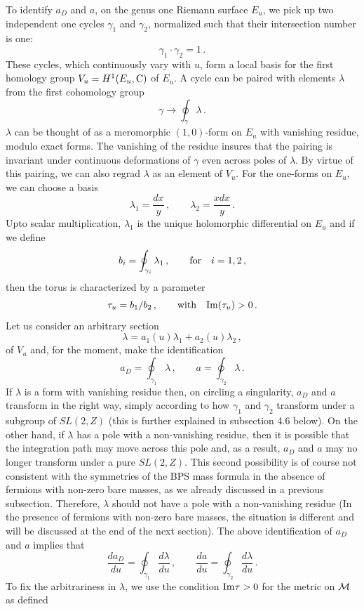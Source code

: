 To identify $a_D$ and $a$, on the genus one Riemann surface $E_u$, we
pick up two independent one cycles $\gamma_1$ and $\gamma_2$,
normalized such that their intersection number is one: 
$$
\gamma_1 \cdot \gamma_2 = 1\,.
$$
These cycles, which continuously vary with $u$, form a local basis for
the first homology group $V_u=H^1(E_u,{\rm C})$ of $E_u$. A cycle can
be paired with elements $\lambda$ from the first cohomology group 
$$
\gamma \rightarrow  \oint_{\gamma} \lambda\,.
$$
$\lambda$ can be thought of as a meromorphic $(1,0)$-form on $E_u$
with vanishing residue, modulo exact forms. The vanishing of the
residue insures that the pairing is invariant under continuous
deformations of $\gamma$ even across poles of $\lambda$. By virtue of
this pairing, we can also regrad $\lambda$ as an element of $V_u$. For
the one-forms on $E_u$, we can choose a basis   
$$
\lambda_{1} = \frac{dx}{y}\,, \qquad \lambda_{2} = \frac{xdx}{y}\,.
$$
Upto scalar multiplication, $\lambda_1$ is the unique holomorphic
differential on $E_u$ and if we define
$$
b_i=\oint_{\gamma_i}\lambda_1\,,\qquad{\rm for}\quad i = 1,2\,,
$$
then the torus is characterized by a parameter
$$
\tau_u = b_1/b_2\,,\qquad {\rm with} \quad {\rm Im}(\tau_u) > 0\,. 
$$
Let us consider an arbitrary section
$$
\lambda = a_1(u) \lambda_1 + a_2 (u) \lambda_2\,,
$$
of $V_u$ and, for the moment, make the identification
$$
a_D=\oint_{\gamma_1}\lambda\,,\qquad a=\oint_{\gamma_2}\lambda\,.
$$
If $\lambda$ is a form with vanishing residue then, on circling a
singularity, $a_D$ and $a$ transform in the right way, simply
according to how $\gamma_1$ and $\gamma_2$ transform under a subgroup
of $SL(2,Z)$ (this is further explained in subsection 4.6 below). On
the other hand, if $\lambda$ has a pole with a non-vanishing residue,
then it is possible that the integration path may move across this
pole and, as a result, $a_D$ and $a$ may no longer transform under a
pure $SL(2,Z)$. This second possibility is of course not consistent
with the symmetries of the BPS mass formula in the absence of fermions
with non-zero bare masses, as we already discussed in a previous
subsection. Therefore, $\lambda$ should not have a pole with a
non-vanishing residue (In the presence of fermions with non-zero bare
masses, the situation is different and will be discussed at the end of
the next section). The above identification of $a_D$ and $a$ implies
that  
$$
\frac{da_D}{du}=\oint_{\gamma_1}\frac{d\lambda}{du}\,,\qquad
\frac{da}{du}=\oint_{\gamma_2}\frac{d\lambda}{du}\,.
$$
To fix the arbitrariness in $\lambda$, we use the condition 
${\rm Im}\tau > 0$ for the metric on ${\cal M}$ as defined

